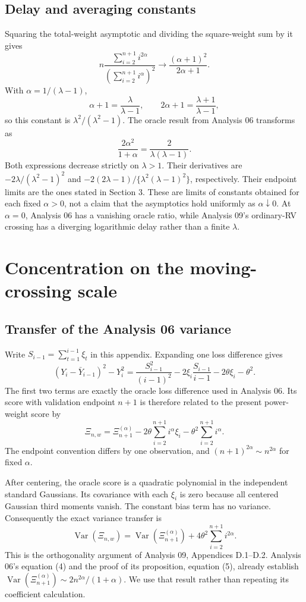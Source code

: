 \documentclass[11pt]{article}
\theoremstyle{definition}
\begin{document}
\subsection{Delay and averaging constants}\label{app:parameterization}
Squaring the total-weight asymptotic and dividing the square-weight
sum by it gives
\[
n\frac{\sum_{i=2}^{n+1}i^{2\alpha}}
{(\sum_{i=2}^{n+1}i^\alpha)^2}
\to\frac{(\alpha+1)^2}{2\alpha+1}.
\]
With $\alpha=1/(\lambda-1)$,
\[
\alpha+1=\frac{\lambda}{\lambda-1},\qquad
2\alpha+1=\frac{\lambda+1}{\lambda-1},
\]
so this constant is $\lambda^2/(\lambda^2-1)$. The oracle result
from Analysis 06 transforms as
\[
\frac{2\alpha^2}{1+\alpha}
=\frac{2}{\lambda(\lambda-1)}.
\]
Both expressions decrease strictly on $\lambda>1$. Their derivatives
are $-2\lambda/(\lambda^2-1)^2$ and
$-2(2\lambda-1)/\{\lambda^2(\lambda-1)^2\}$, respectively.
Their endpoint limits are the ones stated in Section 3.
These are limits of constants obtained for each fixed $\alpha>0$,
not a claim that the asymptotics hold uniformly as $\alpha\downarrow0$.
At $\alpha=0$, Analysis 06 has a vanishing oracle ratio, while
Analysis 09's ordinary-RV crossing has a diverging logarithmic delay
rather than a finite $\lambda$.

\section{Concentration on the moving-crossing scale}

\subsection{Transfer of the Analysis 06 variance}\label{app:transfer}
Write $S_{i-1}=\sum_{t=1}^{i-1}\xi_t$ in this appendix. Expanding
one loss difference gives
\[
(Y_i-\bar Y_{i-1})^2-Y_i^2
=\frac{S_{i-1}^2}{(i-1)^2}
-2\xi_i\frac{S_{i-1}}{i-1}-2\theta\xi_i-\theta^2.
\]
The first two terms are exactly the oracle loss difference used in
Analysis 06. Its score with validation endpoint $n+1$ is therefore
related to the present power-weight score by
\[
\Xi_{n,w}=\Xi_{n+1}^{(\alpha)}
-2\theta\sum_{i=2}^{n+1}i^\alpha\xi_i
-\theta^2\sum_{i=2}^{n+1}i^\alpha.
\]
The endpoint convention differs by one observation, and
$(n+1)^{2\alpha}\sim n^{2\alpha}$ for fixed $\alpha$.

After centering, the oracle score is a quadratic polynomial in the
independent standard Gaussians. Its covariance with each $\xi_i$ is
zero because all centered Gaussian third moments vanish. The constant
bias term has no variance. Consequently the exact variance transfer is
\[
\operatorname{Var}(\Xi_{n,w})
=\operatorname{Var}(\Xi_{n+1}^{(\alpha)})
+4\theta^2\sum_{i=2}^{n+1}i^{2\alpha}.
\]
This is the orthogonality argument of Analysis 09, Appendices D.1--D.2.
Analysis 06's equation (4) and the proof of its proposition, equation
(5), already establish
$\operatorname{Var}(\Xi_{n+1}^{(\alpha)})\sim2n^{2\alpha}/(1+\alpha)$.
We use that result rather than repeating its coefficient calculation.
\end{document}
